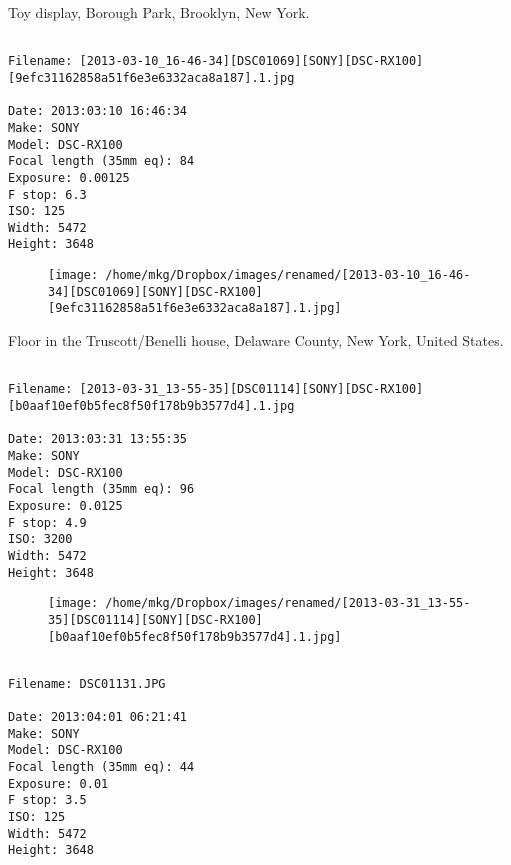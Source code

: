 \clearpage
\onecolumn
\noindent Toy display, Borough Park, Brooklyn, New York.
\noindent
\begin{lstlisting}

Filename: [2013-03-10_16-46-34][DSC01069][SONY][DSC-RX100][9efc31162858a51f6e3e6332aca8a187].1.jpg

Date: 2013:03:10 16:46:34
Make: SONY
Model: DSC-RX100
Focal length (35mm eq): 84
Exposure: 0.00125
F stop: 6.3
ISO: 125
Width: 5472
Height: 3648
\end{lstlisting}
\clearpage

\begin{figure}
\texttt{[image: /home/mkg/Dropbox/images/renamed/[2013-03-10\_16-46-34][DSC01069][SONY][DSC-RX100][9efc31162858a51f6e3e6332aca8a187].1.jpg]}
\end{figure}
    
\clearpage
\onecolumn
\noindent Floor in the Truscott/Benelli house, Delaware County, New York, United States.
\noindent
\begin{lstlisting}

Filename: [2013-03-31_13-55-35][DSC01114][SONY][DSC-RX100][b0aaf10ef0b5fec8f50f178b9b3577d4].1.jpg

Date: 2013:03:31 13:55:35
Make: SONY
Model: DSC-RX100
Focal length (35mm eq): 96
Exposure: 0.0125
F stop: 4.9
ISO: 3200
Width: 5472
Height: 3648
\end{lstlisting}
\clearpage

\begin{figure}
\texttt{[image: /home/mkg/Dropbox/images/renamed/[2013-03-31\_13-55-35][DSC01114][SONY][DSC-RX100][b0aaf10ef0b5fec8f50f178b9b3577d4].1.jpg]}
\end{figure}
    
\clearpage
\onecolumn
\noindent 
\noindent
\begin{lstlisting}

Filename: DSC01131.JPG

Date: 2013:04:01 06:21:41
Make: SONY
Model: DSC-RX100
Focal length (35mm eq): 44
Exposure: 0.01
F stop: 3.5
ISO: 125
Width: 5472
Height: 3648
\end{lstlisting}
\clearpage

